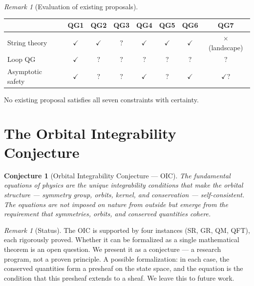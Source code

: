 \documentclass[12pt]{article}
\theoremstyle{plain}
\theoremstyle{definition}
\newtheorem*{conjecture}{Conjecture}
\theoremstyle{remark}
\newtheorem{remark}[theorem]{Remark}
\begin{document}
\begin{remark}[Evaluation of existing proposals]
\begin{center}\footnotesize
\begin{tabular}{lccccccc}\toprule
& QG1 & QG2 & QG3 & QG4 & QG5 & QG6 & QG7 \\\midrule
String theory & $\checkmark$ & $\checkmark$ & $?$ & $\checkmark$ & $\checkmark$ & $\checkmark$ & $\times$ (landscape) \\
Loop QG & $\checkmark$ & $?$ & $?$ & $?$ & $?$ & $?$ & $?$ \\
Asymptotic safety & $\checkmark$ & $?$ & $?$ & $\checkmark$ & $?$ & $\checkmark$ & $\checkmark?$ \\
\bottomrule
\end{tabular}
\end{center}
No existing proposal satisfies all seven constraints with certainty.
\end{remark}


\section{The Orbital Integrability Conjecture}
\label{sec:oip}

\begin{conjecture}[Orbital Integrability Conjecture --- OIC]
\textit{The fundamental equations of physics are the unique integrability conditions that make the orbital structure --- symmetry group, orbits, kernel, and conservation --- self-consistent. The equations are not imposed on nature from outside but emerge from the requirement that symmetries, orbits, and conserved quantities cohere.}
\end{conjecture}

\begin{remark}[Status]
The OIC is supported by four instances (SR, GR, QM, QFT), each rigorously proved. Whether it can be formalized as a single mathematical theorem is an open question. We present it as a conjecture --- a research program, not a proven principle. A possible formalization: in each case, the conserved quantities form a presheaf on the state space, and the equation is the condition that this presheaf extends to a sheaf. We leave this to future work.
\end{remark}
\end{document}
